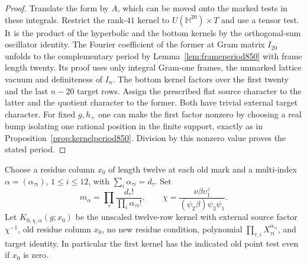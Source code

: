 \documentclass[a4paper,11pt]{article}
\theoremstyle{definition}
\theoremstyle{remark}
\numberwithin{equation}{section}
\begin{document}
\begin{proof}
Translate the form by \(A\), which can be moved onto the marked
tests in these integrals. Restrict the rank-\(41\) kernel to
\(U(\mathbb H^{20})\times T\) and use a tensor test. It is
the product of the hyperbolic and the bottom kernels by the
orthogonal-sum oscillator identity. The Fourier coefficient
of the former at Gram matrix \(I_{20}\) unfolds to the
complementary period by Lemma~\ref{lem:frameperiod850} with
frame length twenty. Its proof uses only integral Gram-one
frames, the unmarked lattice vacuum and definiteness of \(I_n\).
The bottom kernel factors over the first twenty and the last
\(n-20\) target rows. Assign the prescribed flat source character
to the latter and the quotient character to the former. Both
have trivial external target character. For fixed \(g,h_+\)
one can make the first factor nonzero by choosing a real bump
isolating one rational position in the finite support, exactly
as in Proposition~\ref{prop:kernelperiod850}. Division by this
nonzero value proves the stated period.
\end{proof}

Choose a residue column \(x_0\) of length twelve at each old
mark and a multi-index \(\alpha=(\alpha_{\tau i})\), \(1\le i\le12\),
with \(\sum_i\alpha_{\tau i}=d_\tau\). Set
\[
    m_\alpha=\prod_\tau\frac{d_\tau!}{\prod_i\alpha_{\tau i}!},
   \qquad
    \chi=\frac{\nu\beta\upsilon_1^z}
                    {(\psi_2\beta)\psi_3\psi_1}.
\]
Let \(K_{0,\chi,\alpha}(g;x_0)\) be the unscaled twelve-row
kernel with external source factor \(\chi^{-1}\), old residue
column \(x_0\), no new residue condition, polynomial
\(\prod_{\tau,i}X_{\tau i}^{\alpha_{\tau i}}\), and target
identity. In particular the first kernel has the indicated
old point test even if \(x_0\) is zero.
\end{document}
